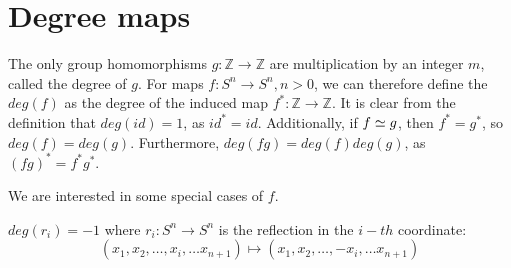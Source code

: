 \section{Degree maps}\label{sec-degree-maps}
The only group homomorphisms $g: \mathbb{Z} \rightarrow \mathbb{Z}$ are multiplication by an integer $m$, called the degree of $g$. For maps $f:S^n\rightarrow S^n,n>0$, we can therefore define the  $deg(f)$ as the degree of the induced map $f^*: \mathbb{Z}\rightarrow \mathbb{Z}$. It is clear from the definition that $deg(id)=1$, as $id^*=id$. Additionally, if $f\simeq g$, then $f^*=g^*$, so $deg(f)=deg(g)$. Furthermore, $deg(fg)=deg(f)deg(g)$, as $(fg)^*=f^*g^*$. 

We are interested in some special cases of $f$.

\begin{proposition}
$deg(r_i)=-1$ where $r_i:S^n\rightarrow S^n$ is the reflection in the $i-th$ coordinate:
$$(x_1,x_2,\dots,x_i,\dots x_{n+1})\mapsto (x_1,x_2,\dots,-x_i,\dots x_{n+1})$$
\end{proposition}
